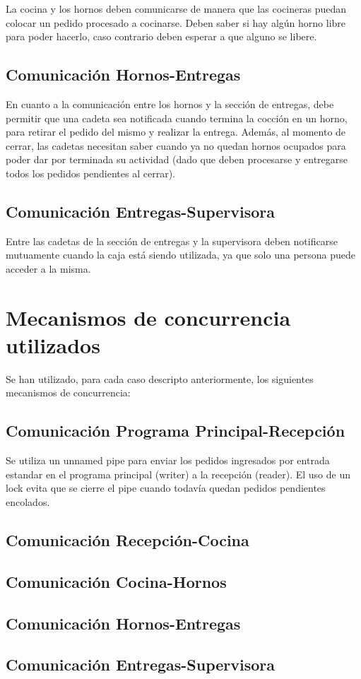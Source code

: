 \documentclass[11pt,spanish,a4paper,openany,notitlepage]{article}
\begin{document}
La cocina y los hornos deben comunicarse de manera que las cocineras puedan colocar un pedido 
procesado a cocinarse. Deben saber si hay algún horno libre para poder hacerlo, caso contrario 
deben esperar a que alguno se libere.

\subsection{Comunicación Hornos-Entregas}

En cuanto a la comunicación entre los hornos y la sección de entregas, debe permitir que una cadeta 
sea notificada cuando termina la cocción en un horno, para retirar el pedido del mismo y realizar 
la entrega. Además, al momento de cerrar, las cadetas necesitan saber cuando ya no quedan hornos 
ocupados para poder dar por terminada su actividad (dado que deben procesarse y entregarse todos 
los pedidos pendientes al cerrar).

\subsection{Comunicación Entregas-Supervisora}

Entre las cadetas de la sección de entregas y la supervisora deben notificarse mutuamente cuando la 
caja está siendo utilizada, ya que solo una persona puede acceder a la misma. 

\section{Mecanismos de concurrencia utilizados}

Se han utilizado, para cada caso descripto anteriormente, los siguientes mecanismos de concurrencia:

\subsection{Comunicación Programa Principal-Recepción}

Se utiliza un unnamed pipe para enviar los pedidos ingresados por entrada estandar en el programa 
principal (writer) a la recepción (reader). El uso de un lock evita que se cierre el pipe cuando 
todavía quedan pedidos pendientes encolados.

\subsection{Comunicación Recepción-Cocina}



\subsection{Comunicación Cocina-Hornos}

\subsection{Comunicación Hornos-Entregas}

\subsection{Comunicación Entregas-Supervisora}
\end{document}
